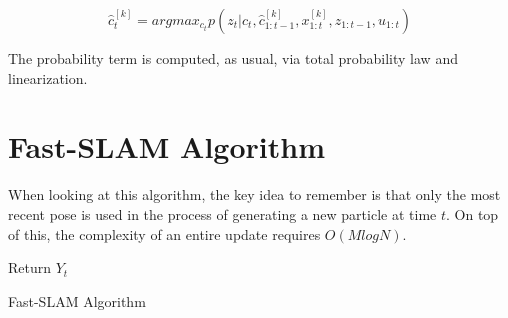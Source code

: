 \documentclass[twoside]{article}
\begin{document}
\begin{equation}
\hat{c}_t^{[k]}=argmax_{c_t}p(z_t|c_t,\hat{c}_{1:t-1}^{[k]},x_{1:t}^{[k]},z_{1:t-1},u_{1:t})
\end{equation}

The probability term is computed, as usual, via total probability law and linearization.

\section{Fast-SLAM Algorithm}

When looking at this algorithm, the key idea to remember is that only the most recent pose is used in the process of generating a new particle at time $t$.  On top of this, the complexity of an entire update requires $O(M logN)$.

\begin{algorithm}[H]
    \SetAlgoLined
    Return $Y_t$
    \caption{Fast-SLAM Algorithm}
    \label{alg:fastslam}
\end{algorithm}
\end{document}
